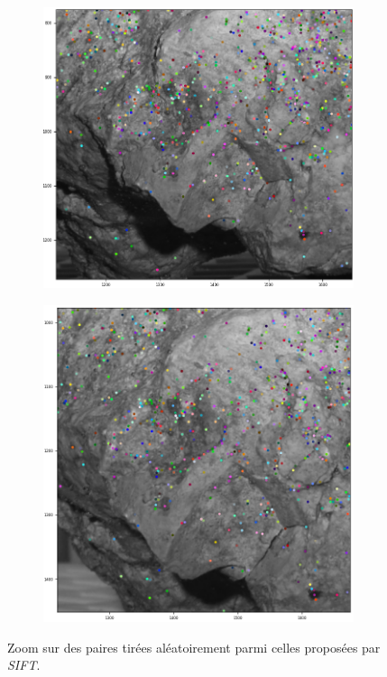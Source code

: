 \documentclass[
	a4paper, %
	10pt, %
	unnumberedsections, %
	twoside, %
]{LTJournalArticle}
\begin{document}
\begin{figure}
	\centering
	\begin{subfigure}[H]{0.45\textwidth}
		\centering
		\includegraphics[width=\textwidth]{images/irl_sift_z1_g.png}
	\end{subfigure}
	\hfill
	\begin{subfigure}[H]{0.45\textwidth}
		\centering
		\includegraphics[width=\textwidth]{images/irl_sift_z1_d.png}
	\end{subfigure}
	\caption{Zoom sur des paires tirées aléatoirement parmi celles proposées par \textit{SIFT}.}
	\label{figure:fig_irl_sift}
\end{figure}
\end{document}
